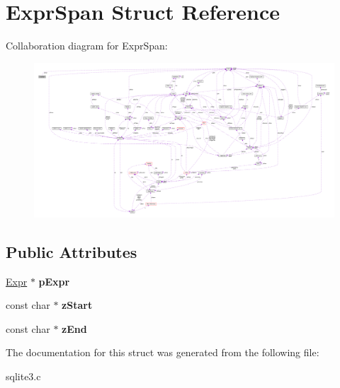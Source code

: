 \hypertarget{structExprSpan}{}\section{Expr\+Span Struct Reference}
\label{structExprSpan}


Collaboration diagram for Expr\+Span\+:\nopagebreak
\begin{figure}[H]
\begin{center}
\leavevmode
\includegraphics[width=350pt]{structExprSpan__coll__graph}
\end{center}
\end{figure}
\subsection*{Public Attributes}
\begin{DoxyCompactItemize}
\item 
\hyperlink{structExpr}{Expr} $\ast$ {\bfseries p\+Expr}\hypertarget{structExprSpan_a081c4aa031331c8518c1173b2a8335cc}{}\label{structExprSpan_a081c4aa031331c8518c1173b2a8335cc}

\item 
const char $\ast$ {\bfseries z\+Start}\hypertarget{structExprSpan_af4653638d7e67a62e7a607f682b38e25}{}\label{structExprSpan_af4653638d7e67a62e7a607f682b38e25}

\item 
const char $\ast$ {\bfseries z\+End}\hypertarget{structExprSpan_a7cdf42cea729fcb5a1c477c3825ab575}{}\label{structExprSpan_a7cdf42cea729fcb5a1c477c3825ab575}

\end{DoxyCompactItemize}


The documentation for this struct was generated from the following file\+:\begin{DoxyCompactItemize}
\item 
sqlite3.\+c\end{DoxyCompactItemize}
